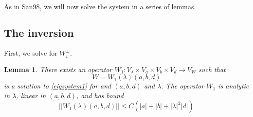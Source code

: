 \documentclass[12pt]{article}
\newtheorem{lemma}{Lemma}
\begin{document}
As in San98, we will now solve the system in a series of lemmas.

\subsection{The inversion}
First, we solve for $W_i^\pm$. 

\begin{lemma}\label{eiginv1}
There exists an operator $W_1: V_\lambda \times V_a \times V_b \times V_d \rightarrow V_W$ such that
\[
W = W_1(\lambda)(a,b,d)
\]
is a solution to \eqref{eigsystem1} for and $(a,b,d)$ and $\lambda$. The operator $W_1$ is analytic in $\lambda$, linear in $(a,b,d)$, and has bound
\begin{equation}\label{W1bound}
||W_1(\lambda)(a,b,d)|| \leq C \left( |a| + |b| + |\lambda|^2 |d| \right)
\end{equation}


\end{lemma}
\end{document}
